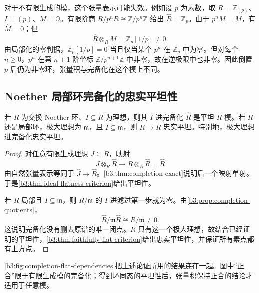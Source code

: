 对于不有限生成的模，这个张量表示可能失效。例如设 \(p\) 为素数，取 \(R=\mathbb Z_{(p)}\)、\(I=(p)\)、\(M=\mathbb Q\)。有限阶商 \(R/p^nR\cong\mathbb Z/p^n\mathbb Z\) 给出 \(\widehat R=\mathbb Z_p\)。由于 \(p^nM=M\)，有 \(\widehat M=0\)；但
\[
	\widehat R\otimes_RM=\mathbb Z_p[1/p]\ne0.
\]
由局部化的零判据，\(\mathbb Z_p[1/p]=0\) 当且仅当某个 \(p^n\) 在 \(\mathbb Z_p\) 中为零。但对每个 \(n\ge0\)，\(p^n\) 在第 \(n+1\) 阶坐标 \(\mathbb Z/p^{n+1}\mathbb Z\) 中非零，故在逆极限中也非零。因此倒置 \(p\) 后仍为非零环，张量积与完备化在这个模上不同。

\subsection{Noether 局部环完备化的忠实平坦性}
\label{b3:subsec:1304:02}
\label{b3:subsec:1304:04}

\begin{theorem}\label{b3:thm:completion-flat}
	若 \(R\) 为交换 Noether 环、\(I\subseteq R\) 为理想，则其 \(I\) 进完备化 \(\widehat R\) 是平坦 \(R\) 模。若 \(R\) 还是局部环，极大理想为 \(\mathfrak m\)，且 \(I\subseteq\mathfrak m\)，则 \(R\rightarrow\widehat R\) 忠实平坦。特别地，极大理想进完备化忠实平坦。
\end{theorem}
\begin{proof}
	对任意有限生成理想 \(J\subseteq R\)，映射
	\[
		J\otimes_R\widehat R\longrightarrow R\otimes_R\widehat R=\widehat R
	\]
	由自然张量表示等同于 \(\widehat J\rightarrow\widehat R\)。\cref{b3:thm:completion-exact}说明后一个映射单射。于是\cref{b3:thm:ideal-flatness-criterion}给出平坦性。

	若 \(R\) 局部且 \(I\subseteq\mathfrak m\)，则 \(R/\mathfrak m\) 的 \(I\) 进滤过第一步就为零。由\cref{b3:prop:completion-quotients}，
	\[
		\widehat R/\mathfrak m\widehat R\cong R/\mathfrak m\ne0.
	\]
	这说明完备化没有删去原谱的唯一闭点。\(R\) 只有这一个极大理想，故结合已经证明的平坦性，\cref{b3:thm:faithfully-flat-criterion}给出忠实平坦性，并保证所有素点都有上方点。
\end{proof}

\cref{b3:fig:completion-flat-dependencies}把上述论证所用的结果连在一起。图中“正合”限于有限生成模的完备化；得到环同态的平坦性后，张量积保持正合的结论才适用于任意模。

